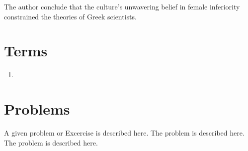 The author conclude that the culture's unwavering belief in female inferiority constrained the theories of Greek scientists.


\section{Terms}
\label{sec:terms5}

\begin{enumerate}
    \item
\end{enumerate}


%
%
%


\section*{Problems}
%
\begin{prob}
\label{prob1}
A given problem or Excercise is described here. The
problem is described here. The problem is described here.
\end{prob}



